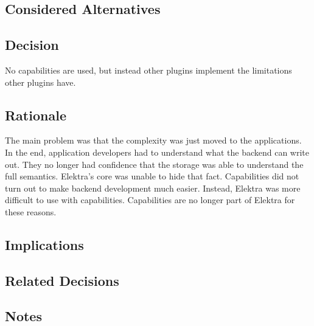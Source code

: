 \subsection*{Considered Alternatives}

\subsection*{Decision}

No capabilities are used, but instead other plugins implement the limitations other plugins have.

\subsection*{Rationale}

The main problem was that the complexity was just moved to the applications. In the end, application developers had to understand what the backend can write out. They no longer had confidence that the storage was able to understand the full semantics. Elektra’s core was unable to hide that fact. Capabilities did not turn out to make backend development much easier. Instead, Elektra was more difficult to use with capabilities. Capabilities are no longer part of Elektra for these reasons.

\subsection*{Implications}

\subsection*{Related Decisions}

\subsection*{Notes}